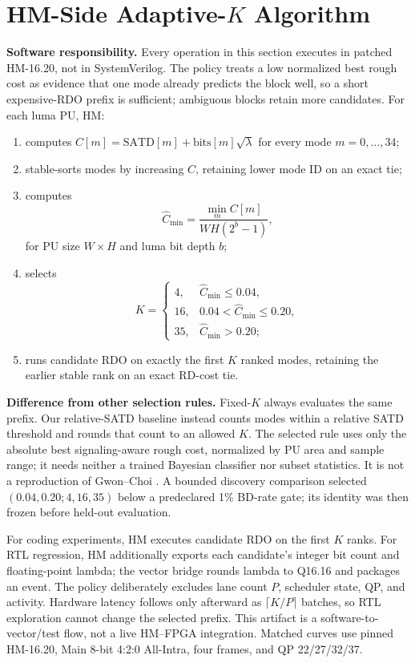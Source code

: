 \documentclass[journal]{IEEEtran}
\begin{document}
\section{HM-Side Adaptive-$K$ Algorithm}
\textbf{Software responsibility.} Every operation in this section executes in
patched HM-16.20, not in SystemVerilog. The policy treats a low normalized best
rough cost as evidence that one mode already predicts the block well, so a
short expensive-RDO prefix is sufficient; ambiguous blocks retain more
candidates. For each luma PU, HM:
\begin{enumerate}
  \item computes
  $C[m]=\mathrm{SATD}[m]+\mathrm{bits}[m]\sqrt{\lambda}$ for every mode
  $m=0,\ldots,34$;
  \item stable-sorts modes by increasing $C$, retaining lower mode ID on an
  exact tie;
  \item computes
  \begin{equation}
    \widehat C_{\min}=\frac{\min_m C[m]}{WH(2^b-1)},
  \end{equation}
  for PU size $W\!\times\!H$ and luma bit depth $b$;
  \item selects
  \begin{equation}
  K=\begin{cases}
      4,  & \widehat C_{\min}\le 0.04,\\
      16, & 0.04<\widehat C_{\min}\le 0.20,\\
      35, & \widehat C_{\min}>0.20;
    \end{cases}
  \end{equation}
  \item runs candidate RDO on exactly the first $K$ ranked modes, retaining
  the earlier stable rank on an exact RD-cost tie.
\end{enumerate}

\textbf{Difference from other selection rules.} Fixed-$K$ always evaluates the
same prefix. Our relative-SATD baseline instead counts modes within a relative
SATD threshold and rounds that count to an allowed $K$. The selected rule uses
only the absolute best signaling-aware rough cost, normalized by PU area and
sample range; it needs neither a trained Bayesian classifier nor subset
statistics. It is not a reproduction of Gwon--Choi \cite{gwon2019}. A bounded
discovery comparison selected $(0.04,0.20;4,16,35)$ below a predeclared 1\%
BD-rate gate; its identity was then frozen before held-out evaluation.

For coding experiments, HM executes candidate RDO on the first $K$ ranks. For
RTL regression, HM additionally exports each candidate's integer bit count and
floating-point lambda; the vector bridge rounds lambda to Q16.16 and packages
an event. The policy deliberately excludes lane count $P$, scheduler state,
QP, and activity. Hardware latency follows only afterward as
$\lceil K/P\rceil$ batches, so RTL exploration cannot change the selected
prefix. This artifact is a software-to-vector/test flow, not a live HM--FPGA
integration. Matched curves use pinned HM-16.20, Main 8-bit 4:2:0 All-Intra,
four frames, and QP 22/27/32/37.
\end{document}

